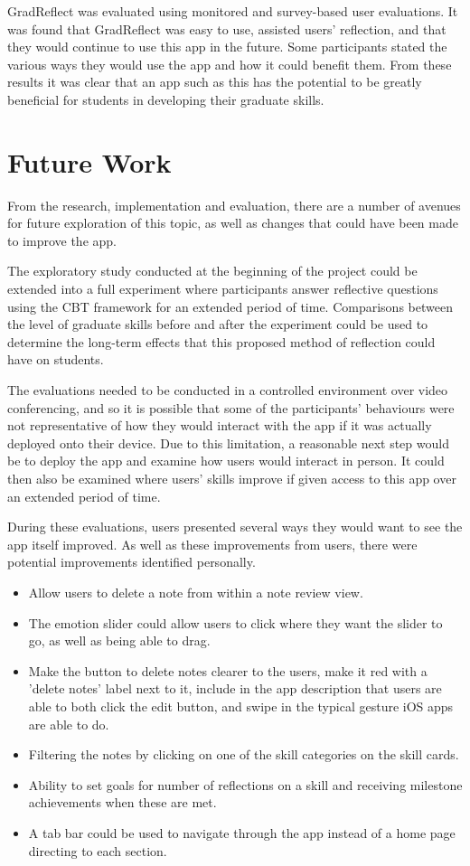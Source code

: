 \documentclass{l4proj}
\begin{document}
GradReflect was evaluated using monitored and survey-based user evaluations. It was found that GradReflect was easy to use, assisted users’ reflection, and that they would continue to use this app in the future. Some participants stated the various ways they would use the app and how it could benefit them. From these results it was clear that an app such as this has the potential to be greatly beneficial for students in developing their graduate skills.

\section{Future Work} \label{Concl_futureWork}

From the research, implementation and evaluation, there are a number of avenues for future exploration of this topic, as well as changes that could have been made to improve the app. 

The exploratory study conducted at the beginning of the project could be extended into a full experiment where participants answer reflective questions using the CBT framework for an extended period of time. Comparisons between the level of graduate skills before and after the experiment could be used to determine the long-term effects that this proposed method of reflection could have on students. 

The evaluations needed to be conducted in a controlled environment over video conferencing, and so it is possible that some of the participants’ behaviours were not representative of how they would interact with the app if it was actually deployed onto their device. Due to this limitation, a reasonable next step would be to deploy the app and examine how users would interact in person. It could then also be examined where users’ skills improve if given access to this app over an extended period of time.

During these evaluations, users presented several ways they would want to see the app itself improved. As well as these improvements from users, there were potential improvements identified personally.

\begin{itemize}
    \item Allow users to delete a note from within a note review view.
    \item The emotion slider could allow users to click where they want the slider to go, as well as being able to drag.
    \item Make the button to delete notes clearer to the users, make it red with a 'delete notes' label next to it, include in the app description that users are able to both click the edit button, and swipe in the typical gesture iOS apps are able to do.
    \item Filtering the notes by clicking on one of the skill categories on the skill cards.
    \item Ability to set goals for number of reflections on a skill and receiving milestone achievements when these are met.
    \item A tab bar could be used to navigate through the app instead of a home page directing to each section.
\end{itemize}
\end{document}

